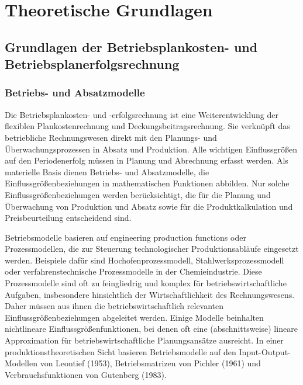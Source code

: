 \chapter{Theoretische Grundlagen}

\section{Grundlagen der Betriebsplankosten- und Betriebsplanerfolgsrechnung}

\subsection{Betriebs- und Absatzmodelle}

Die Betriebsplankosten- und -erfolgsrechnung ist eine Weiterentwicklung der flexiblen Plankostenrechnung und Deckungsbeitragsrechnung. Sie verknüpft das betriebliche Rechnungswesen direkt mit den Planungs- und Überwachungsprozessen in Absatz und Produktion. Alle wichtigen Einflussgrö{\ss}en auf den Periodenerfolg müssen in Planung und Abrechnung erfasst werden. Als materielle Basis dienen Betriebs- und Absatzmodelle, die Einflussgrö{\ss}enbeziehungen in mathematischen Funktionen abbilden. Nur solche Einflussgrö{\ss}enbeziehungen werden berücksichtigt, die für die Planung und Überwachung von Produktion und Absatz sowie für die Produktkalkulation und Preisbeurteilung entscheidend sind.

Betriebsmodelle basieren auf engineering production functions oder Prozessmodellen, die zur Steuerung technologischer Produktionsabläufe eingesetzt werden. Beispiele dafür sind Hochofenprozessmodell, Stahlwerksprozessmodell oder verfahrenstechnische Prozessmodelle in der Chemieindustrie. Diese Prozessmodelle sind oft zu feingliedrig und komplex für betriebswirtschaftliche Aufgaben, insbesondere hinsichtlich der Wirtschaftlichkeit des Rechnungswesens. Daher müssen aus ihnen die betriebswirtschaftlich relevanten Einflussgrö{\ss}enbeziehungen abgeleitet werden. Einige Modelle beinhalten nichtlineare Einflussgrö{\ss}enfunktionen, bei denen oft eine (abschnittsweise) lineare Approximation für betriebswirtschaftliche Planungsansätze ausreicht. In einer produktionstheoretischen Sicht basieren Betriebsmodelle auf den Input-Output-Modellen von Leontief (1953), Betriebsmatrizen von Pichler (1961) und Verbrauchsfunktionen von Gutenberg (1983).

